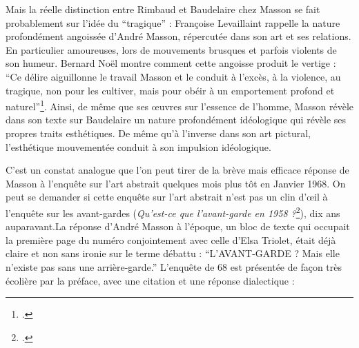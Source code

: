 	Mais la réelle distinction entre Rimbaud et Baudelaire chez Masson se fait probablement sur l’idée du \enquote{tragique} : Françoise Levaillaint rappelle la nature profondément angoissée d’André Masson, répercutée dans son art et ses relations. En particulier amoureuses, lors de mouvements brusques et parfois violents de son humeur. Bernard Noël montre comment cette angoisse produit le vertige : \enquote{Ce délire aiguillonne le travail Masson et le conduit à l’excès, à la violence, au tragique, non pour les cultiver, mais pour obéir à un emportement profond et naturel}\footcite[p83]{noel}.  Ainsi, de même que ses \oe{}uvres sur l’essence de l’homme, Masson révèle dans son texte sur Baudelaire un nature profondément idéologique qui révèle ses propres traits esthétiques. De même qu’à l’inverse dans son art pictural, l’esthétique mouvementée conduit à son impulsion idéologique. 

C’est un constat analogue que l’on peut tirer de la brève mais efficace réponse de Masson à l’enquête sur l’art abstrait quelques mois plus tôt en Janvier 1968. On peut se demander si cette enquête sur l’art abstrait n’est pas un clin d’\oe{}il à l’enquête sur les avant-gardes (\emph{Qu’est-ce que l’avant-garde en 1958 ?}\footcite{avantgarde}), dix ans auparavant.La réponse d’André Masson à l’époque, un bloc de texte qui occupait la première page du numéro conjointement avec celle d’Elsa Triolet, était déjà claire et non sans ironie sur le terme débattu : \enquote{L’AVANT-GARDE ? Mais elle n’existe pas sans une arrière-garde.} L’enquête de 68 est présentée de façon très écolière par la préface, avec une citation et une réponse dialectique : 

